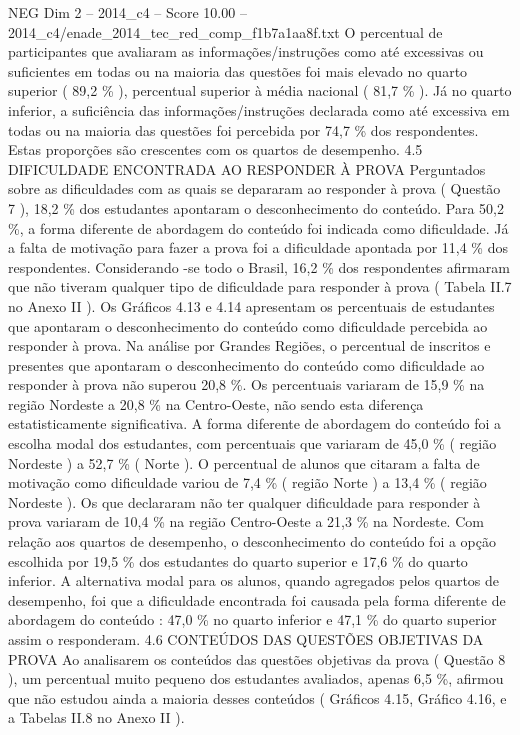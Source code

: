 \begin{textsample}{NEG Dim 2 – 2014\_c4 – Score 10.00 – 2014\_c4/enade\_2014\_tec\_red\_comp\_f1b7a1aa8f.txt}
O percentual de participantes que avaliaram as informações/instruções como até excessivas ou suficientes em todas ou na maioria das questões foi mais elevado no quarto superior ( 89,2 \% ), percentual superior à média nacional ( 81,7 \% ).
Já no quarto inferior, a suficiência das informações/instruções declarada como até excessiva em todas ou na maioria das questões foi percebida por 74,7 \% dos respondentes.
Estas proporções são crescentes com os quartos de desempenho. 4.5 DIFICULDADE ENCONTRADA AO RESPONDER À PROVA Perguntados sobre as dificuldades com as quais se depararam ao responder à prova ( Questão 7 ), 18,2 \% dos estudantes apontaram o desconhecimento do conteúdo.
Para 50,2 \%, a forma diferente de abordagem do conteúdo foi indicada como dificuldade.
Já a falta de motivação para fazer a prova foi a dificuldade apontada por 11,4 \% dos respondentes.
Considerando -se todo o Brasil, 16,2 \% dos respondentes afirmaram que não tiveram qualquer tipo de dificuldade para responder à prova ( Tabela II.7 no Anexo II ).
Os Gráficos 4.13 e 4.14 apresentam os percentuais de estudantes que apontaram o desconhecimento do conteúdo como dificuldade percebida ao responder à prova.
Na análise por Grandes Regiões, o percentual de inscritos e presentes que apontaram o desconhecimento do conteúdo como dificuldade ao responder à prova não superou 20,8 \%.
Os percentuais variaram de 15,9 \% na região Nordeste a 20,8 \% na Centro-Oeste, não sendo esta diferença estatisticamente significativa.
A forma diferente de abordagem do conteúdo foi a escolha modal dos estudantes, com percentuais que variaram de 45,0 \% ( região Nordeste ) a 52,7 \% ( Norte ).
O percentual de alunos que citaram a falta de motivação como dificuldade variou de 7,4 \% ( região Norte ) a 13,4 \% ( região Nordeste ).
Os que declararam não ter qualquer dificuldade para responder à prova variaram de 10,4 \% na região Centro-Oeste a 21,3 \% na Nordeste.
Com relação aos quartos de desempenho, o desconhecimento do conteúdo foi a opção escolhida por 19,5 \% dos estudantes do quarto superior e 17,6 \% do quarto inferior.
A alternativa modal para os alunos, quando agregados pelos quartos de desempenho, foi que a dificuldade encontrada foi causada pela forma diferente de abordagem do conteúdo : 47,0 \% no quarto inferior e 47,1 \% do quarto superior assim o responderam. 4.6 CONTEÚDOS DAS QUESTÕES OBJETIVAS DA PROVA Ao analisarem os conteúdos das questões objetivas da prova ( Questão 8 ), um percentual muito pequeno dos estudantes avaliados, apenas 6,5 \%, afirmou que não estudou ainda a maioria desses conteúdos ( Gráficos 4.15, Gráfico 4.16, e a Tabelas II.8 no Anexo II ).

\end{textsample}
